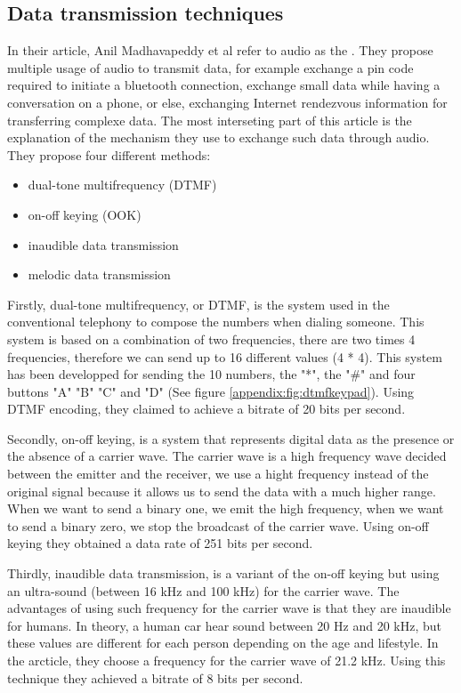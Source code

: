 \documentclass[twocolumn,14pt]{extarticle}
\begin{document}
\subsection{Data transmission techniques}
In their article, Anil Madhavapeddy et al refer to audio as the  \cite{1495392}. They propose multiple usage of audio to transmit data, for example exchange a pin code required to initiate a bluetooth connection, exchange small data while having a conversation on a phone, or else, exchanging Internet rendezvous information for transferring complexe data. The most interseting part of this article is the explanation of the mechanism they use to exchange such data through audio. They propose four different methods:
\begin{itemize}
\item dual-tone multifrequency (DTMF)
\item on-off keying (OOK)
\item inaudible data transmission
\item melodic data transmission
\end{itemize}

Firstly, dual-tone multifrequency, or DTMF, is the system used in the conventional telephony to compose the numbers when dialing someone. This system is based on a combination of two frequencies, there are two times 4 frequencies, therefore we can send up to 16 different values (4 * 4). This system has been developped for sending the 10 numbers, the "*", the "\#" and four buttons "A" "B" "C" and "D" (See figure \ref{appendix:fig:dtmfkeypad}). Using DTMF encoding, they claimed to achieve a bitrate of 20 bits per second.

Secondly, on-off keying, is a system that represents digital data as the presence or the absence of a carrier wave. The carrier wave is a high frequency wave decided between the emitter and the receiver, we use a hight frequency instead of the original signal because it allows us to send the data with a much higher range. When we want to send a binary one, we emit the high frequency, when we want to send a binary zero, we stop the broadcast of the carrier wave. Using on-off keying they obtained a data rate of 251 bits per second.

Thirdly, inaudible data transmission, is a variant of the on-off keying but using an ultra-sound (between 16 kHz and 100 kHz) for the carrier wave. The advantages of using such frequency for the carrier wave is that they are inaudible for humans. In theory, a human car hear sound between 20 Hz and 20 kHz, but these values are different for each person depending on the age and lifestyle. In the arcticle, they choose a frequency for the carrier wave of 21.2 kHz. Using this technique they achieved a bitrate of 8 bits per second.
\end{document}
